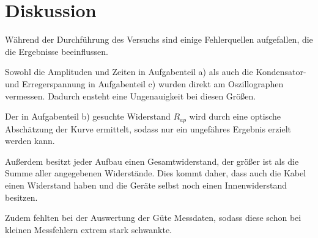 \section{Diskussion}
\label{sec:Diskussion}
Während der Durchführung des Versuchs sind einige Fehlerquellen aufgefallen, die die Ergebnisse beeinflussen.

\noindent
Sowohl die Amplituden und Zeiten in Aufgabenteil a) als auch die Kondensator- und Erregerspannung in Aufgabenteil c) 
wurden direkt am Oszillographen vermessen.
Dadurch ensteht eine Ungenauigkeit bei diesen Größen.

\noindent
Der in Aufgabenteil b) gesuchte Widerstand $R_{ap}$ wird durch eine optische Abschätzung der Kurve ermittelt,
sodass nur ein ungefähres Ergebnis erzielt werden kann.

\noindent
Außerdem besitzt jeder Aufbau einen Gesamtwiderstand, der größer ist als die Summe aller angegebenen Widerstände.
Dies kommt daher, dass auch die Kabel einen Widerstand haben und die Geräte selbst noch einen Innenwiderstand besitzen.

\noindent
Zudem fehlten bei der Auswertung der Güte Messdaten, sodass diese schon bei kleinen Messfehlern extrem stark schwankte. 